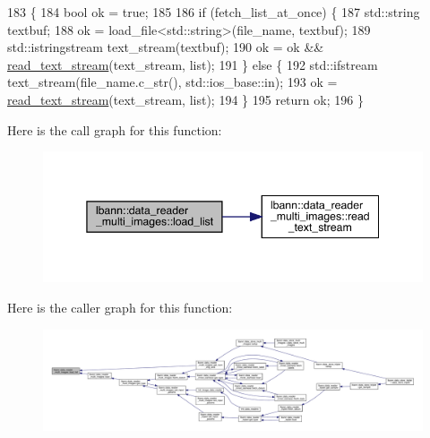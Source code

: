 \begin{DoxyCode}
183 \{
184   \textcolor{keywordtype}{bool} ok = \textcolor{keyword}{true};
185 
186   \textcolor{keywordflow}{if} (fetch\_list\_at\_once) \{
187     std::string textbuf;
188     ok = load\_file<std::string>(file\_name, textbuf);
189     std::istringstream text\_stream(textbuf);
190     ok = ok && \hyperlink{classlbann_1_1data__reader__multi__images_a3160c8ee0e30304a1f5fc07d08e6cb40}{read\_text\_stream}(text\_stream, list);
191   \} \textcolor{keywordflow}{else} \{
192     std::ifstream text\_stream(file\_name.c\_str(), std::ios\_base::in);
193     ok = \hyperlink{classlbann_1_1data__reader__multi__images_a3160c8ee0e30304a1f5fc07d08e6cb40}{read\_text\_stream}(text\_stream, list);
194   \}
195   \textcolor{keywordflow}{return} ok;
196 \}
\end{DoxyCode}
Here is the call graph for this function\+:\nopagebreak
\begin{figure}[H]
\begin{center}
\leavevmode
\includegraphics[width=345pt]{classlbann_1_1data__reader__multi__images_a31763c860d3e3cc57a6af0158b9977f7_cgraph}
\end{center}
\end{figure}
Here is the caller graph for this function\+:\nopagebreak
\begin{figure}[H]
\begin{center}
\leavevmode
\includegraphics[width=350pt]{classlbann_1_1data__reader__multi__images_a31763c860d3e3cc57a6af0158b9977f7_icgraph}
\end{center}
\end{figure}
\mbox{\label{classlbann_1_1data__reader__multi__images_a8d9eae4dde10654c1f1bf7c1fe685e99}} 
